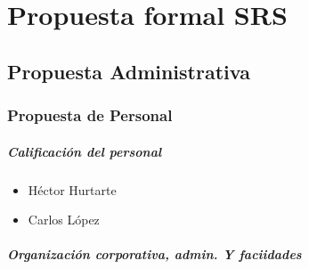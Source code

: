 \chapter{Propuesta formal SRS}

\section{Propuesta Administrativa}

\subsection{Propuesta de Personal}

\paragraph{Calificaci\'{o}n del personal}
\begin{itemize}
\item H\'{e}ctor Hurtarte 
\item Carlos L\'{o}pez
\end{itemize}

\paragraph{Organizaci\'{o}n corporativa, admin. Y faciidades}